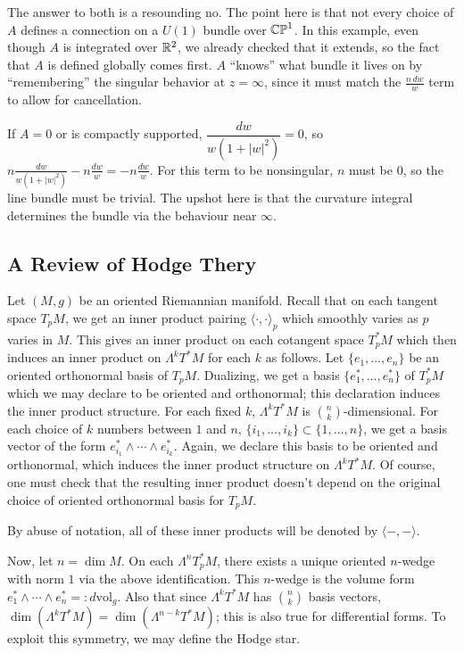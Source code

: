 \documentclass[main]{subfiles}
\begin{document}
The answer to both is a resounding no. The point here is that not every choice of $A$ defines a connection on a $U(1)$ bundle over $\mathbb{CP}^1$. In this example, even though $A$ is integrated over $\mathbb R^2$, we already checked that it extends, so the fact that $A$ is defined globally comes first. $A$ ``knows'' what bundle it lives on by ``remembering'' the singular behavior at $z=\infty$, since it must match the $\frac{n\,dw}{w}$ term to allow for cancellation.

If $A=0$ or is compactly supported, $\dfrac{dw}{w(1+|w|^2)} = 0$, so $n\frac{dw}{w(1+|w|^2)} - n\frac{dw}{w} = -n\frac{dw}{w}$.
For this term to be nonsingular, $n$ must be $0$, so the line bundle must be trivial. The upshot here is that the curvature integral determines the bundle via the behaviour near $\infty$.

\bigskip
\subsection*{A Review of Hodge Thery}
Let $(M,g)$ be an oriented Riemannian manifold. Recall that on each tangent space $T_pM$, we get an inner product pairing $\langle \cdot,\cdot\rangle_p$ which smoothly varies as $p$ varies in $M$.
This gives an inner product on each cotangent space $T_p^\ast M$ which then induces an inner product on $\Lambda^k T^\ast M$ for each $k$ as follows. Let $\{e_1,\ldots,e_n\}$ be an oriented orthonormal basis of $T_pM$. Dualizing, we get a basis $\{e_1^\ast,\ldots,e_n^\ast\}$ of $T_p^\ast M$ which we may declare to be oriented and orthonormal; this declaration induces the inner product structure. For each fixed $k$, $\Lambda^k T^\ast M$ is $\binom{n}{k}$-dimensional. 
For each choice of $k$ numbers between $1$ and $n$, $\{i_1,\ldots,i_k\}\subset\{1,\ldots,n\}$, we get a basis vector of the form $e_{i_1}^\ast \wedge \cdots \wedge e_{i_k}^\ast$. Again, we declare this basis to be oriented and orthonormal, which induces the inner product structure on $\Lambda^k T^\ast M$.
Of course, one must check that the resulting inner product doesn't depend on the original choice of oriented orthonormal basis for $T_pM$.

By abuse of notation, all of these inner products will be denoted by $\langle-,-\rangle$.

Now, let $n = \dim M$. On each $\Lambda^n T_p^\ast M$, there exists a unique oriented $n$-wedge with norm $1$ via the above identification. This $n$-wedge is the volume form $e_1^\ast \wedge \cdots \wedge e_n^\ast =: d\mathrm{vol}_g$.
Also that since $\Lambda^k T^\ast M$ has $\binom{n}{k}$ basis vectors, $\dim(\Lambda^k T^\ast M) = \dim(\Lambda^{n-k}T^\ast M)$; this is also true for differential forms. To exploit this symmetry, we may define the Hodge star.
\end{document}
